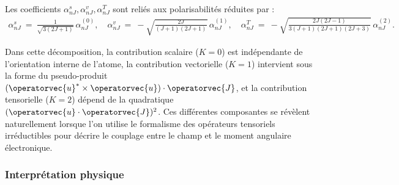 Les coefficients $\alpha^s_{nJ}, \alpha^v_{nJ}, \alpha^T_{nJ}$ sont reliés aux polarisabilités réduites par :
\begin{eqnarray*}
	\alpha^s_{nJ} ~=~ \frac{1}{\sqrt{3(2J+1)}}\,\alpha^{(0)}_{nJ},\quad 
	\alpha^v_{nJ} ~=~ -\sqrt{\frac{2J}{(J+1)(2J+1)}}\,\alpha^{(1)}_{nJ},\quad 
	\alpha^T_{nJ} ~=~ -\sqrt{\frac{2J(2J-1)}{3(J+1)(2J+1)(2J+3)}}\,\alpha^{(2)}_{nJ}.
\end{eqnarray*}

Dans cette décomposition, la contribution scalaire ($K=0$) est indépendante de l’orientation interne de l’atome, la contribution vectorielle ($K=1$) intervient sous la forme du pseudo-produit $(\operatorvec{u}^*\times\operatorvec{u})\cdot\operatorvec{J}$, et la contribution tensorielle ($K=2$) dépend de la quadratique $(\operatorvec{u}\cdot\operatorvec{J})^2$. Ces différentes composantes se révèlent naturellement lorsque l’on utilise le formalisme des opérateurs tensoriels irréductibles pour décrire le couplage entre le champ et le moment angulaire électronique.

\subsubsection{Interprétation physique}


